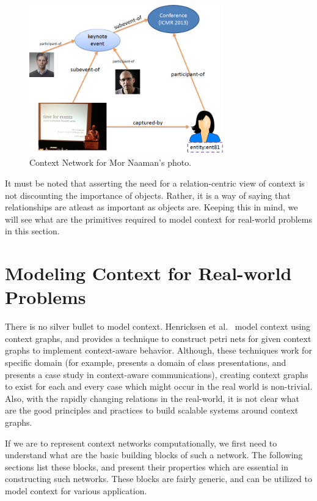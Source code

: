 \begin{figure}[h]
\centering
\includegraphics[width=0.75\textwidth]{media/chapter2/naaman-4.png}
\caption{Context Network for Mor Naaman's photo.}
\label{fig:context-network}
\end{figure}

It must be noted that asserting the need for a relation-centric view of context is not discounting the importance of objects. Rather, it is a way of saying that relationships are atleast as important as objects are. Keeping this in mind, we will see what are the primitives required to model context for real-world problems in this section.

\section{Modeling Context for Real-world Problems}

There is no silver bullet to model context. Henricksen et al.\ \cite{henricksen2002modeling} model context using context graphs, and \cite{reignier2007context} provides a technique to construct petri nets for given context graphs to implement context-aware behavior. Although, these techniques work for specific domain (for example, \cite{reignier2007context} presents a domain of class presentations, and \cite{henricksen2002modeling} presents a case study in context-aware communications), creating context graphs to exist for each and every case which might occur in the real world is non-trivial. Also, with the rapidly changing relations in the real-world, it is not clear what are the good principles and practices to build scalable systems around context graphs.

If we are to represent context networks computationally, we first need to understand what are the basic building blocks of such a network. The following sections list these blocks, and present their properties which are essential in constructing such networks. These blocks are fairly generic, and can be utilized to model context for various application.

